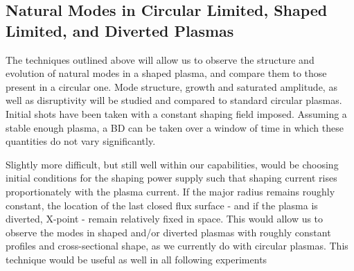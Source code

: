 \documentclass[aps,prl,twocolumn,superscriptaddress,groupedaddress]{revtex4}  %
\begin{document}
	\subsection{Natural Modes in Circular Limited, Shaped Limited, and Diverted Plasmas}		
	The techniques outlined above will allow us to observe the structure and evolution of natural modes in a shaped plasma, and compare them to those present in a circular one.  Mode structure, growth and saturated amplitude, as well as disruptivity will be studied and compared to standard circular plasmas. Initial shots have been taken with a constant shaping field imposed.  Assuming a stable enough plasma, a BD can be taken over a window of time in which these quantities do not vary significantly.\par
	Slightly more difficult, but still well within our capabilities, would be choosing initial conditions for the shaping power supply such that shaping current rises proportionately with the plasma current.  If the major radius remains roughly constant, the location of the last closed flux surface - and if the plasma is diverted, X-point - remain relatively fixed in space.  This would allow us to observe the modes in shaped and/or diverted plasmas with roughly constant profiles and cross-sectional shape, as we currently do with circular plasmas.  This technique would be useful as well in all following experiments\par
\end{document}
